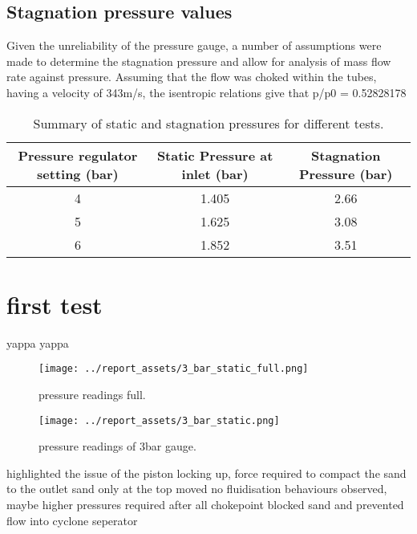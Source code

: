 \subsection{Stagnation pressure values}
Given the unreliability of the pressure gauge, a number of assumptions were made to determine the stagnation pressure and allow for analysis of mass flow rate against pressure. Assuming that the flow was choked within the tubes, having a velocity of 343m/s, the isentropic relations give that p/p0 =  0.52828178
\begin{table}[htbp]
    \centering
    \begin{tabular}{|c|c|c|}
        \hline
        Pressure regulator setting (bar) & Static Pressure at inlet (bar) &  Stagnation Pressure (bar) \\
        \hline
        4 & 1.405 & 2.66 \\
        5 & 1.625 & 3.08 \\
        6 & 1.852 & 3.51 \\
        \hline
    \end{tabular}
    \caption{Summary of static and stagnation pressures for different tests.}
    \label{tab:static-stag-pressures}
\end{table}

\section{first test}
yappa yappa
\begin{figure}[htbp]
    \centering

    \begin{minipage}{0.45\textwidth}
        \centering
        \texttt{[image: ../report\_assets/3\_bar\_static\_full.png]}
        \caption{pressure readings full.}\label{fig:static-pres-drop-3bar_full}
    \end{minipage}
    \hfill
    \begin{minipage}{0.45\textwidth}
        \centering
        \texttt{[image: ../report\_assets/3\_bar\_static.png]}
        \caption{pressure readings of 3bar gauge.}\label{fig:static-pressurop-3bar}
    \end{minipage}

\end{figure}
highlighted the issue of the piston locking up,
force required to compact the sand to the outlet
sand only at the top moved
no fluidisation behaviours observed, maybe higher pressures required after all
chokepoint blocked sand and prevented flow into cyclone seperator
